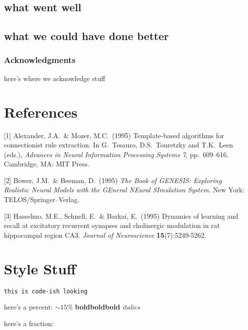 \documentclass{article}
\begin{document}
\subsection{what went well}
\subsection{what we could have done better}

\subsubsection*{Acknowledgments}

here's where we acknowledge stuff

\section*{References}

\medskip

\small

[1] Alexander, J.A.\ \& Mozer, M.C.\ (1995) Template-based algorithms
for connectionist rule extraction. In G.\ Tesauro, D.S.\ Touretzky and
T.K.\ Leen (eds.), {\it Advances in Neural Information Processing
  Systems 7}, pp.\ 609--616. Cambridge, MA: MIT Press.

[2] Bower, J.M.\ \& Beeman, D.\ (1995) {\it The Book of GENESIS:
  Exploring Realistic Neural Models with the GEneral NEural SImulation
  System.}  New York: TELOS/Springer--Verlag.

[3] Hasselmo, M.E., Schnell, E.\ \& Barkai, E.\ (1995) Dynamics of
learning and recall at excitatory recurrent synapses and cholinergic
modulation in rat hippocampal region CA3. {\it Journal of
  Neuroscience} {\bf 15}(7):5249-5262.

\section{Style Stuff}
\verb+this is code-ish looking+ 

here's a percent: $\sim$$15\%$
\textbf{boldboldbold}
\emph{italics}

here's a fraction: 
\end{document}
